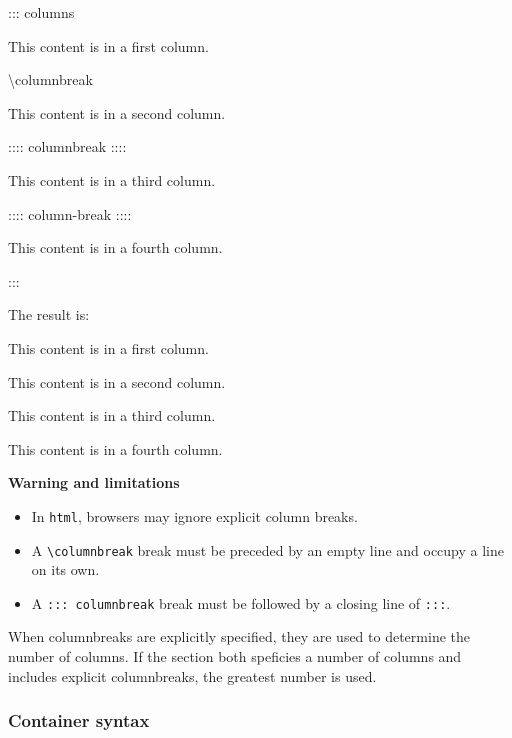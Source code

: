 \documentclass[
]{article}
\newenvironment{Shaded}{}{}
\newcommand{\NormalTok}[1]{#1}
\providecommand{\tightlist}{%
  \setlength{\itemsep}{0pt}\setlength{\parskip}{0pt}}
\begin{document}
\begin{Shaded}
\begin{Highlighting}[]
\NormalTok{::: columns}

\NormalTok{This content is in a first column.}

\NormalTok{\textbackslash{}columnbreak}

\NormalTok{This content is in a second column.}

\NormalTok{:::: columnbreak}
\NormalTok{::::}

\NormalTok{This content is in a third column.}

\NormalTok{:::: column{-}break}
\NormalTok{::::}

\NormalTok{This content is in a fourth column.}

\NormalTok{:::}
\end{Highlighting}
\end{Shaded}

The result is:

{\raggedcolumns\begin{multicols}{4}

This content is in a first column.

\columnbreak

This content is in a second column.

\columnbreak

This content is in a third column.

\columnbreak

This content is in a fourth column.

\end{multicols}
}

\textbf{Warning and limitations}

\begin{itemize}
\tightlist
\item
  In \texttt{html}, browsers may ignore explicit column breaks.
\item
  A \texttt{\textbackslash{}columnbreak} break must be preceded by an
  empty line and occupy a line on its own.
\item
  A \texttt{:::\ columnbreak} break must be followed by a closing line
  of \texttt{:::}.
\end{itemize}

When columnbreaks are explicitly specified, they are used to determine
the number of columns. If the section both speficies a number of columns
and includes explicit columnbreaks, the greatest number is used.

\hypertarget{container-syntax}{%
\subsubsection{Container syntax}\label{container-syntax}}
\end{document}
